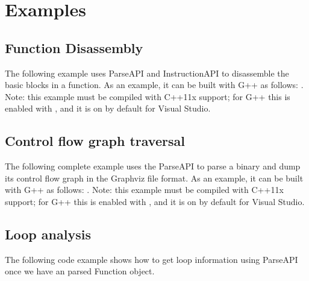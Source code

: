 \section{Examples}
\label{sec:example}

\subsection{Function Disassembly}

The following example uses ParseAPI and InstructionAPI to disassemble
the basic blocks in a function. As an example, it can be built with
G++ as follows: . Note: this example must be
compiled with C++11x support; for G++ this is enabled with
, and it is on by default for Visual Studio.

\lstset{numbers=left, numberstyle=\tiny, stepnumber=5, numbersep=5pt}
\lstset{showstringspaces=false}


\subsection{Control flow graph traversal}

The following complete example uses the ParseAPI to parse a binary and
dump its control flow graph in the Graphviz file format. As an
example, it can be built with G++ as follows: . Note: this example must be compiled with C++11x support;
for G++ this is enabled with , and it is on by
default for Visual Studio.

\lstset{numbers=left, numberstyle=\tiny, stepnumber=5, numbersep=5pt}
\lstset{showstringspaces=false}


\subsection{Loop analysis}

The following code example shows how to get loop information using ParseAPI once we have an parsed Function object.

